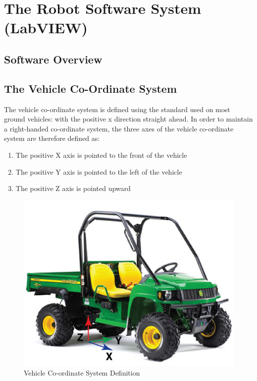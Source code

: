 \section{The Robot Software System (LabVIEW)}

\subsection{Software Overview}

\subsection{The Vehicle Co-Ordinate System}

The vehicle co-ordinate system is defined using the standard used on most ground vehicles: with the positive x direction straight ahead. In order to maintain a right-handed co-ordinate system, the three axes of the vehicle co-ordinate system are therefore defined as:

\begin{enumerate}
\item The positive X axis is pointed to the front of the vehicle
\item The positive Y axis is pointed to the left of the vehicle
\item The positive Z axis is pointed upward
\end{enumerate}

\begin{figure}[h!]
\centering
\includegraphics[scale=.7]{Photos/veh_coord.png}
\caption{Vehicle Co-ordinate System Definition}
\label{fig:veh_coord}
\end{figure} 


